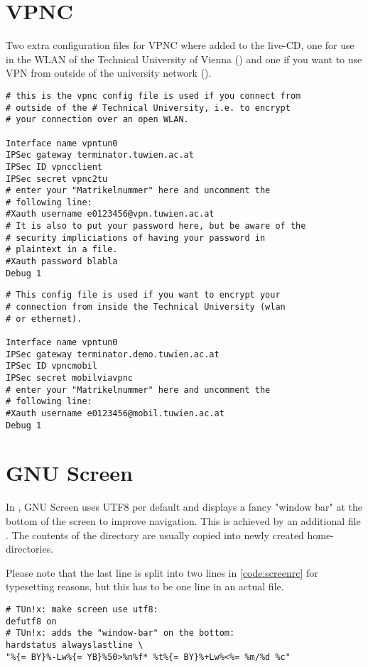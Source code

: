\section{VPNC}
Two extra configuration files for VPNC where added to the live-CD, one for use
in the WLAN of the Technical University of Vienna ()
and one if you want to use VPN from outside of the university network
().
\begin{lstlisting}[float=ht,label=code:vpnc.conf,caption=VPNC config-file for
use from outside of the University]
# this is the vpnc config file is used if you connect from
# outside of the # Technical University, i.e. to encrypt
# your connection over an open WLAN.

Interface name vpntun0
IPSec gateway terminator.tuwien.ac.at
IPSec ID vpncclient
IPSec secret vpnc2tu
# enter your "Matrikelnummer" here and uncomment the
# following line:
#Xauth username e0123456@vpn.tuwien.ac.at
# It is also to put your password here, but be aware of the
# security impliciations of having your password in
# plaintext in a file.
#Xauth password blabla
Debug 1
\end{lstlisting}

\begin{lstlisting}[float=ht,label=code:vpnc.wlan.conf,caption=VPNC config-file for
use in the TU of Vienna WLAN]
# This config file is used if you want to encrypt your
# connection from inside the Technical University (wlan
# or ethernet).

Interface name vpntun0
IPSec gateway terminator.demo.tuwien.ac.at
IPSec ID vpncmobil
IPSec secret mobilviavpnc
# enter your "Matrikelnummer" here and uncomment the
# following line:
#Xauth username e0123456@mobil.tuwien.ac.at
Debug 1
\end{lstlisting}

\section{GNU Screen}
In \tunix, GNU Screen uses UTF8 per default and displays a fancy "window bar" at
the bottom of the screen to improve navigation. This is achieved by an
additional file . The contents of the 
directory are usually copied into newly created home-directories.

Please note that the last line is split into two lines in \lstlistingname{}
\ref{code:screenrc} for typesetting reasons, but this has to be one line in an
actual file.
\begin{lstlisting}[float=ht,label=code:screenrc,caption=Additional configuration
for GNU Screen]
# TUn!x: make screen use utf8:
defutf8 on
# TUn!x: adds the "window-bar" on the bottom:
hardstatus alwayslastline \
"%{= BY}%-Lw%{= YB}%50>%n%f* %t%{= BY}%+Lw%<%= %m/%d %c"
\end{lstlisting}

